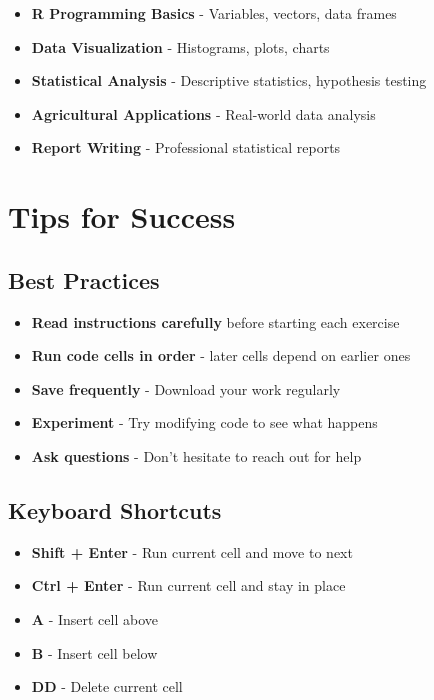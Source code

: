 \documentclass[11pt,a4paper]{article}
\begin{document}
\begin{itemize}
    \item \textbf{R Programming Basics} - Variables, vectors, data frames
    \item \textbf{Data Visualization} - Histograms, plots, charts
    \item \textbf{Statistical Analysis} - Descriptive statistics, hypothesis testing
    \item \textbf{Agricultural Applications} - Real-world data analysis
    \item \textbf{Report Writing} - Professional statistical reports
\end{itemize}

\section{Tips for Success}

\subsection{Best Practices}

\begin{itemize}
    \item \textbf{Read instructions carefully} before starting each exercise
    \item \textbf{Run code cells in order} - later cells depend on earlier ones
    \item \textbf{Save frequently} - Download your work regularly
    \item \textbf{Experiment} - Try modifying code to see what happens
    \item \textbf{Ask questions} - Don't hesitate to reach out for help
\end{itemize}

\subsection{Keyboard Shortcuts}

\begin{itemize}
    \item \textbf{Shift + Enter} - Run current cell and move to next
    \item \textbf{Ctrl + Enter} - Run current cell and stay in place
    \item \textbf{A} - Insert cell above
    \item \textbf{B} - Insert cell below
    \item \textbf{DD} - Delete current cell
\end{itemize}
\end{document}

